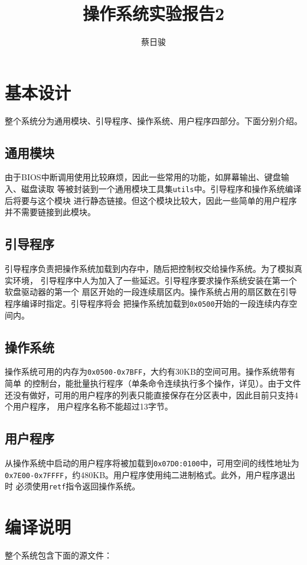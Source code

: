 \documentclass[adobefonts, a4paper]{ctexart}
\title{操作系统实验报告2}
\author{蔡日骏\quad12348003}
\begin{document}
\maketitle

\section{基本设计}
整个系统分为通用模块、引导程序、操作系统、用户程序四部分。下面分别介绍。

\subsection{通用模块}
由于BIOS中断调用使用比较麻烦，因此一些常用的功能，如屏幕输出、键盘输入、磁盘读取
等被封装到一个通用模块工具集\verb|utils|中。引导程序和操作系统编译后将要与这个模块
进行静态链接。但这个模块比较大，因此一些简单的用户程序并不需要链接到此模块。

\subsection{引导程序}
引导程序负责把操作系统加载到内存中，随后把控制权交给操作系统。为了模拟真实环境，
引导程序中人为加入了一些延迟。引导程序要求操作系统安装在第一个软盘驱动器的第一个
扇区开始的一段连续扇区内。操作系统占用的扇区数在引导程序编译时指定。引导程序将会
把操作系统加载到\verb|0x0500|开始的一段连续内存空间内。

\subsection{操作系统}
操作系统可用的内存为\verb|0x0500-0x7BFF|，大约有30KB的空间可用。操作系统带有简单
的控制台，能批量执行程序（单条命令连续执行多个操作，详见）。由于文件
还没有做好，可用的用户程序的列表只能直接保存在分区表中，因此目前只支持4个用户程序，
用户程序名称不能超过13字节。

\subsection{用户程序}
从操作系统中启动的用户程序将被加载到\verb|0x07D0:0100|中，可用空间的线性地址为
\verb|0x7E00-0x7FFFF|，约480KB。用户程序使用纯二进制格式。此外，用户程序退出时
必须使用\verb|retf|指令返回操作系统。


\section{编译说明}
整个系统包含下面的源文件：
\end{document}
